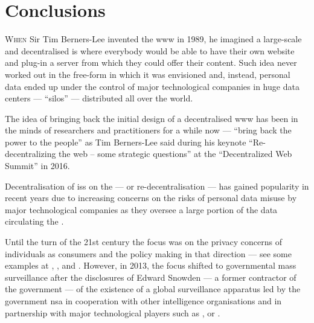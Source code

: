 
\chapter{Conclusions}
    \label{chapter:thesis:conclusions}

\lettrine{\textcolor[gray]{.25}{W}}{hen} Sir Tim Berners-Lee invented the \Ac{www} 
in 1989, he imagined a large-scale and decentralised \ac{is} where everybody would 
be able to have their own website and plug-in a server from which they could offer 
their content. Such idea never worked out in the free-form in which it was envisioned 
and, instead, personal data ended up under the control of major technological companies 
in huge data centers --- ``silos'' --- distributed all over the world.

The idea of bringing back the initial design of a decentralised \ac{www} has been 
in the minds of researchers and practitioners for a while now --- ``bring back the 
power to the people'' as Tim Berners-Lee said during his keynote ``Re-decentralizing 
the web -- some strategic questions'' at the ``Decentralized Web Summit'' in 2016. 

Decentralisation of \acp{is} on the \Internet --- or re-decentralisation --- has 
gained popularity in recent years due to increasing concerns on the risks of personal 
data misuse by major technological companies as they oversee a large portion of 
the data circulating the \Internet.

Until the turn of the 21st century the focus was on the privacy concerns of individuals 
as consumers and the policy making in that direction --- see some examples at \cite{MilbergBSK95}, 
\cite{Rindfleisch97}, \cite{Clarke99} and \cite{NamSPI06}. However, in 2013, the 
focus shifted to governmental mass surveillance after the disclosures of Edward 
Snowden --- a former contractor of the  government --- of the existence 
of a global surveillance apparatus led by the  government \Ac{nsa} in cooperation 
with other intelligence organisations and in partnership with major technological 
players such as \Google, \Facebook or \Apple. 

